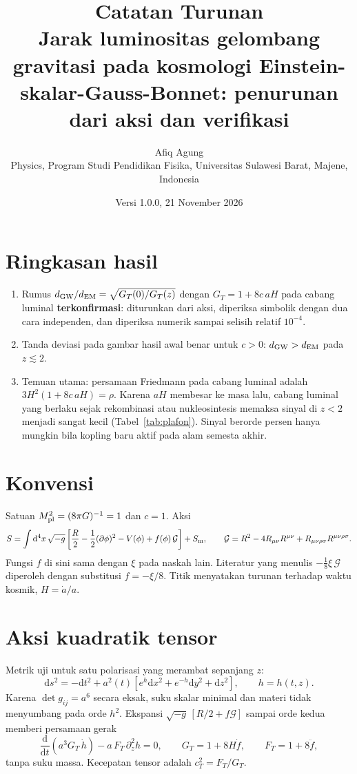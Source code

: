 \documentclass[11pt,a4paper]{article}
\title{\vspace{-1.5cm}Catatan Turunan\\[2pt]\large Jarak luminositas gelombang gravitasi pada kosmologi Einstein-skalar-Gauss-Bonnet: penurunan dari aksi dan verifikasi}
\author{Afiq Agung\\ {\small Physics, Program Studi Pendidikan Fisika, Universitas Sulawesi Barat, Majene, Indonesia}}
\date{Versi 1.0.0, 21 November 2026}
\newcommand{\dd}{\mathrm{d}}
\begin{document}
\maketitle

\section*{Ringkasan hasil}
\begin{enumerate}[leftmargin=*,itemsep=2pt]
\item Rumus $d_{\rm GW}/d_{\rm EM}=\sqrt{G_T(0)/G_T(z)}$ dengan $G_T=1+8c\,aH$ pada cabang luminal \textbf{terkonfirmasi}: diturunkan dari aksi, diperiksa simbolik dengan dua cara independen, dan diperiksa numerik sampai selisih relatif $10^{-4}$.
\item Tanda deviasi pada gambar hasil awal benar untuk $c>0$: $d_{\rm GW}>d_{\rm EM}$ pada $z\lesssim 2$.
\item Temuan utama: persamaan Friedmann pada cabang luminal adalah $3H^2(1+8c\,aH)=\rho$. Karena $aH$ membesar ke masa lalu, cabang luminal yang berlaku sejak rekombinasi atau nukleosintesis memaksa sinyal di $z<2$ menjadi sangat kecil (Tabel~\ref{tab:plafon}). Sinyal berorde persen hanya mungkin bila kopling baru aktif pada alam semesta akhir.
\end{enumerate}

\section{Konvensi}
Satuan $M_{\rm pl}^2=(8\pi G)^{-1}=1$ dan $c=1$. Aksi
\begin{equation}
S=\int \dd^4x\,\sqrt{-g}\left[\frac{R}{2}-\frac12(\partial\phi)^2-V(\phi)+f(\phi)\,\mathcal{G}\right]+S_{\rm m},\qquad
\mathcal{G}=R^2-4R_{\mu\nu}R^{\mu\nu}+R_{\mu\nu\rho\sigma}R^{\mu\nu\rho\sigma}.
\end{equation}
Fungsi $f$ di sini sama dengan $\xi$ pada naskah lain. Literatur yang menulis $-\tfrac18\xi\,\mathcal{G}$ diperoleh dengan substitusi $f=-\xi/8$. Titik menyatakan turunan terhadap waktu kosmik, $H=\dot a/a$.

\section{Aksi kuadratik tensor}
Metrik uji untuk satu polarisasi yang merambat sepanjang $z$:
\begin{equation}
\dd s^2=-\dd t^2+a^2(t)\left[e^{h}\dd x^2+e^{-h}\dd y^2+\dd z^2\right],\qquad h=h(t,z).
\end{equation}
Karena $\det g_{ij}=a^6$ secara eksak, suku skalar minimal dan materi tidak menyumbang pada orde $h^2$. Ekspansi $\sqrt{-g}\,[R/2+f\mathcal{G}]$ sampai orde kedua memberi persamaan gerak
\begin{equation}
\frac{\dd}{\dd t}\!\left(a^3G_T\,\dot h\right)-a\,F_T\,\partial_z^2h=0,\qquad
G_T=1+8H\dot f,\qquad F_T=1+8\ddot f, \label{eq:tensor}
\end{equation}
tanpa suku massa. Kecepatan tensor adalah $c_T^2=F_T/G_T$.
\end{document}
